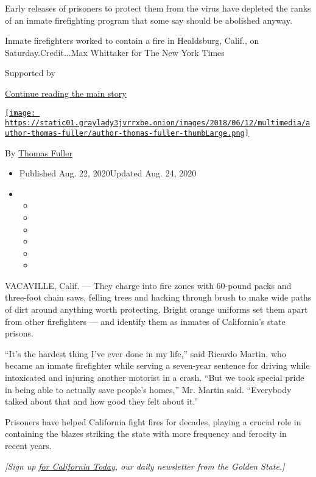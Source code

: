 Early releases of prisoners to protect them from the virus have depleted
the ranks of an inmate firefighting program that some say should be
abolished anyway.

Inmate firefighters worked to contain a fire in Healdsburg, Calif., on
Saturday.Credit...Max Whittaker for The New York Times

Supported by

\protect\hyperlink{after-sponsor}{Continue reading the main story}

\href{https://www.nytimes3xbfgragh.onion/by/thomas-fuller}{\texttt{[image: https://static01.graylady3jvrrxbe.onion/images/2018/06/12/multimedia/author-thomas-fuller/author-thomas-fuller-thumbLarge.png]}}

By \href{https://www.nytimes3xbfgragh.onion/by/thomas-fuller}{Thomas
Fuller}

\begin{itemize}
\item
  Published Aug. 22, 2020Updated Aug. 24, 2020
\item
  \begin{itemize}
  \item
  \item
  \item
  \item
  \item
  \item
  \end{itemize}
\end{itemize}

VACAVILLE, Calif. --- They charge into fire zones with 60-pound packs
and three-foot chain saws, felling trees and hacking through brush to
make wide paths of dirt around anything worth protecting. Bright orange
uniforms set them apart from other firefighters --- and identify them as
inmates of California's state prisons.

``It's the hardest thing I've ever done in my life,'' said Ricardo
Martin, who became an inmate firefighter while serving a seven-year
sentence for driving while intoxicated and injuring another motorist in
a crash. ``But we took special pride in being able to actually save
people's homes,'' Mr. Martin said. ``Everybody talked about that and how
good they felt about it.''

Prisoners have helped California fight fires for decades, playing a
crucial role in containing the blazes striking the state with more
frequency and ferocity in recent years.

\emph{{[}Sign up}
\href{https://www.nytimes3xbfgragh.onion/newsletters/california-today}{\emph{for
California Today}}\emph{, our daily newsletter from the Golden
State.{]}}

